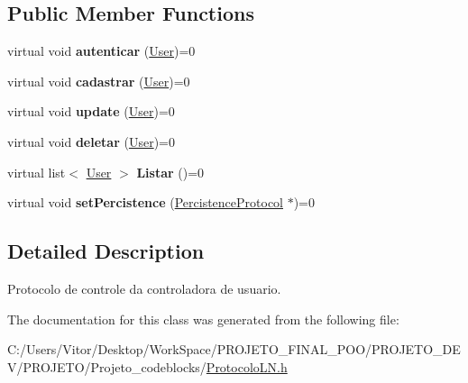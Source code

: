 \subsection*{Public Member Functions}
\begin{DoxyCompactItemize}
\item 
\hypertarget{class_user_protocol_a848b4c9ad3b03384da94606c8f3f39f4}{virtual void {\bfseries autenticar} (\hyperlink{class_user}{User})=0}\label{class_user_protocol_a848b4c9ad3b03384da94606c8f3f39f4}

\item 
\hypertarget{class_user_protocol_a82ef4359d21dea2516370077eebc191f}{virtual void {\bfseries cadastrar} (\hyperlink{class_user}{User})=0}\label{class_user_protocol_a82ef4359d21dea2516370077eebc191f}

\item 
\hypertarget{class_user_protocol_a763b2abc464281839f982e6a33a19ebf}{virtual void {\bfseries update} (\hyperlink{class_user}{User})=0}\label{class_user_protocol_a763b2abc464281839f982e6a33a19ebf}

\item 
\hypertarget{class_user_protocol_a60d2fcc3efc076fadd2463980439652e}{virtual void {\bfseries deletar} (\hyperlink{class_user}{User})=0}\label{class_user_protocol_a60d2fcc3efc076fadd2463980439652e}

\item 
\hypertarget{class_user_protocol_a4da9152e6f9f128fb37467c8ee3cdca9}{virtual list$<$ \hyperlink{class_user}{User} $>$ {\bfseries Listar} ()=0}\label{class_user_protocol_a4da9152e6f9f128fb37467c8ee3cdca9}

\item 
\hypertarget{class_user_protocol_acf8d6fb7d463085084cb428ec316d23a}{virtual void {\bfseries set\-Percistence} (\hyperlink{class_percistence_protocol}{Percistence\-Protocol} $\ast$)=0}\label{class_user_protocol_acf8d6fb7d463085084cb428ec316d23a}

\end{DoxyCompactItemize}


\subsection{Detailed Description}
Protocolo de controle da controladora de usuario. 

The documentation for this class was generated from the following file\-:\begin{DoxyCompactItemize}
\item 
C\-:/\-Users/\-Vitor/\-Desktop/\-Work\-Space/\-P\-R\-O\-J\-E\-T\-O\-\_\-\-F\-I\-N\-A\-L\-\_\-\-P\-O\-O/\-P\-R\-O\-J\-E\-T\-O\-\_\-\-D\-E\-V/\-P\-R\-O\-J\-E\-T\-O/\-Projeto\-\_\-codeblocks/\hyperlink{_protocolo_l_n_8h}{Protocolo\-L\-N.\-h}\end{DoxyCompactItemize}
